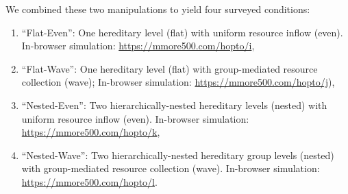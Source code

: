 We combined these two manipulations to yield four surveyed conditions:
\begin{enumerate}
\item ``Flat-Even'': One hereditary level (flat) with uniform resource inflow (even). In-browser simulation: \url{https://mmore500.com/hopto/i},
\item ``Flat-Wave'': One hereditary level (flat) with group-mediated resource collection (wave); In-browser simulation: \url{https://mmore500.com/hopto/j}),
\item ``Nested-Even'': Two hierarchically-nested hereditary levels (nested) with uniform resource inflow (even). In-browser simulation: \url{https://mmore500.com/hopto/k},
\item ``Nested-Wave'': Two hierarchically-nested hereditary group levels (nested) with group-mediated resource collection (wave). In-browser simulation: \url{https://mmore500.com/hopto/l}.
\end{enumerate}
